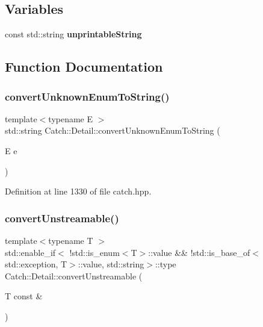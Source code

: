 \subsection*{Variables}
\begin{DoxyCompactItemize}
\item 
const std\+::string \textbf{ unprintable\+String}
\end{DoxyCompactItemize}


\subsection{Function Documentation}
\mbox{\label{namespace_catch_1_1_detail_a242396de537c5176710d680cc9ca6b93}} 
\subsubsection{convertUnknownEnumToString()}
{\footnotesize\ttfamily template$<$typename E $>$ \\
std\+::string Catch\+::\+Detail\+::convert\+Unknown\+Enum\+To\+String (\begin{DoxyParamCaption}\item[{E}]{e }\end{DoxyParamCaption})}



Definition at line 1330 of file catch.\+hpp.

\mbox{\label{namespace_catch_1_1_detail_a8e765acd7fc9eabdc34c786014cf02cd}} 
\subsubsection{convertUnstreamable()\hspace{0.1cm}{\footnotesize\ttfamily [1/3]}}
{\footnotesize\ttfamily template$<$typename T $>$ \\
std\+::enable\+\_\+if$<$ !std\+::is\+\_\+enum$<$T$>$\+::value \&\& !std\+::is\+\_\+base\+\_\+of$<$std\+::exception, T$>$\+::value, std\+::string$>$\+::type Catch\+::\+Detail\+::convert\+Unstreamable (\begin{DoxyParamCaption}\item[{T const \&}]{ }\end{DoxyParamCaption})}



